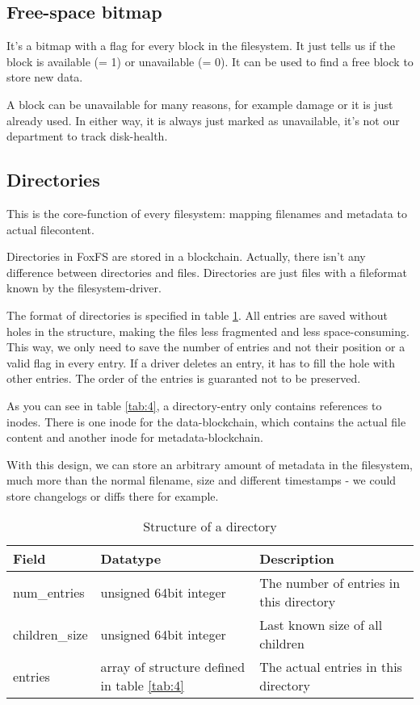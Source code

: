 \documentclass[a4paper,12pt]{article}
\begin{document}
		\subsection{Free-space bitmap}
			It's a bitmap with a flag for every block in the filesystem. It just tells us if the block is available (= 1) or unavailable (= 0). It can be used to find a free block to store new data.
			
			A block can be unavailable for many reasons, for example damage or it is just already used. In either way, it is always just marked as unavailable, it's not our department to track disk-health.
		
		\subsection{Directories}
			This is the core-function of every filesystem: mapping filenames and metadata to actual filecontent.
			
			Directories in FoxFS are stored in a blockchain. Actually, there isn't any difference between directories and files. Directories are just files with a fileformat known by the filesystem-driver.
			
			The format of directories is specified in table \ref{tab:3}. All entries are saved without holes in the structure, making the files less fragmented and less space-consuming. This way, we only need to save the number of entries and not their position or a valid flag in every entry. If a driver deletes an entry, it has to fill the hole with other entries. The order of the entries is guaranted not to be preserved.			
			
			As you can see in table \ref{tab:4}, a directory-entry only contains references to inodes. There is one inode for the data-blockchain, which contains the actual file content and another inode for metadata-blockchain.
			
			With this design, we can store an arbitrary amount of metadata in the filesystem, much more than the normal filename, size and different timestamps - we could store changelogs or diffs there for example.
			
			\begin{table}[ht]
				\caption{Structure of a directory}\label{tab:3}
				\begin{tabularx}{\linewidth}{|l|l|X|} \hline
					\textbf{Field}		& \textbf{Datatype}								& \textbf{Description} \\ \hline
					num\_entries		& unsigned 64bit integer						& The number of entries in this directory \\ \hline
					children\_size		& unsigned 64bit integer						& Last known size of all children \\ \hline
					entries				& array of structure defined in table \ref{tab:4}	& The actual entries in this directory \\ \hline
				\end{tabularx}
			\end{table}
		
\end{document}
